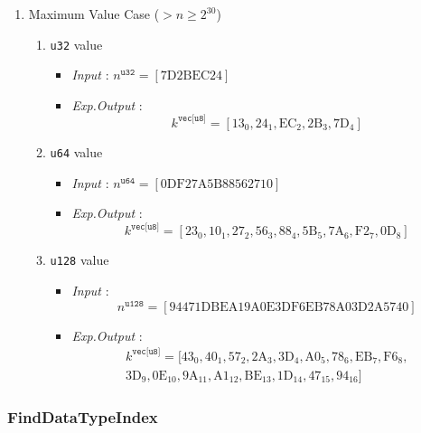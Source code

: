 \documentclass[../alan-handbook.tex]{subfiles}
\begin{document}
\begin{enumerate}
    \item Maximum Value Case ($> n \geq 2^{30}$)
        \begin{enumerate}
            \item \texttt{u32} value
                \begin{itemize}
                    \item \textit{Input} : $n^{\texttt{u32}} = [\text{7D2BEC24}]$
                    \item \textit{Exp.Output} : $$k^{\texttt{vec[u8]}} = [\text{13}_0,\text{24}_1,\text{EC}_2,\text{2B}_3,\text{7D}_4]$$
                \end{itemize}
            \item \texttt{u64} value
                \begin{itemize}
                    \item \textit{Input} : $n^{\texttt{u64}} = [\text{0DF27A5B88562710}]$
                    \item \textit{Exp.Output} : $$k^{\texttt{vec[u8]}} = [\text{23}_0,\text{10}_1,\text{27}_2,\text{56}_3,\text{88}_4,\text{5B}_5,\text{7A}_6,\text{F2}_7,\text{0D}_8]$$
                \end{itemize}
            \item \texttt{u128} value
                \begin{itemize}
                    \item \textit{Input} : $$n^{\texttt{u128}} = [\text{94471DBEA19A0E3DF6EB78A03D2A5740}]$$ 
                    \item \textit{Exp.Output} : 
                        $$
                        \begin{matrix}
                            k^{\texttt{vec[u8]}} = [\text{43}_0,\text{40}_1,\text{57}_2,\text{2A}_3,\text{3D}_4,\text{A0}_5,\text{78}_6,\text{EB}_7,\text{F6}_8, \\
                            \text{3D}_9, \text{0E}_{10}, \text{9A}_{11}, \text{A1}_{12}, \text{BE}_{13}, \text{1D}_{14}, \text{47}_{15}, \text{94}_{16}]
                        \end{matrix}
                        $$
                \end{itemize} 
        \end{enumerate}
\end{enumerate}

\subsubsection{FindDataTypeIndex} \label{Test:FindDataTypeIndex}
\end{document}

